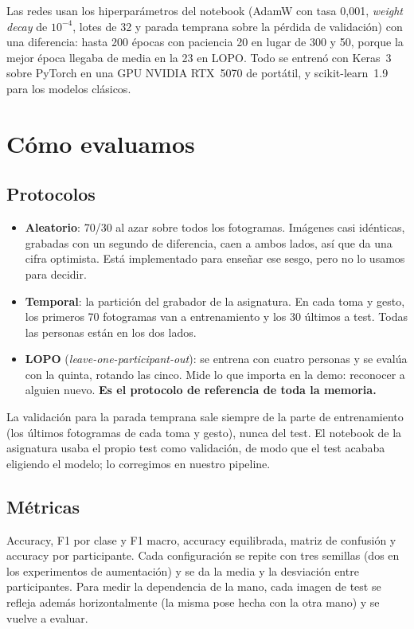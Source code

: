 \documentclass[11pt,a4paper]{article}
\begin{document}
Las redes usan los hiperparámetros del notebook (AdamW con tasa 0,001, \emph{weight decay} de $10^{-4}$, lotes de 32
y parada temprana sobre la pérdida de validación) con una diferencia: hasta 200 épocas con paciencia 20 en lugar de 300
y 50, porque la mejor época llegaba de media en la 23 en LOPO. Todo se entrenó con Keras~3 sobre PyTorch en una GPU
NVIDIA RTX~5070 de portátil, y scikit-learn~1.9 para los modelos clásicos.

\section{Cómo evaluamos}

\subsection{Protocolos}

\begin{itemize}
  \item \textbf{Aleatorio}: 70/30 al azar sobre todos los fotogramas. Imágenes casi idénticas, grabadas con un segundo
        de diferencia, caen a ambos lados, así que da una cifra optimista. Está implementado para enseñar ese sesgo,
        pero no lo usamos para decidir.
  \item \textbf{Temporal}: la partición del grabador de la asignatura. En cada toma y gesto, los primeros 70 fotogramas
        van a entrenamiento y los 30 últimos a test. Todas las personas están en los dos lados.
  \item \textbf{LOPO} (\emph{leave-one-participant-out}): se entrena con cuatro personas y se evalúa con la quinta,
        rotando las cinco. Mide lo que importa en la demo: reconocer a alguien nuevo. \textbf{Es el protocolo de
        referencia de toda la memoria.}
\end{itemize}

La validación para la parada temprana sale siempre de la parte de entrenamiento (los últimos fotogramas de cada toma y
gesto), nunca del test. El notebook de la asignatura usaba el propio test como validación, de modo que el test
acababa eligiendo el modelo; lo corregimos en nuestro pipeline.

\subsection{Métricas}

Accuracy, F1 por clase y F1 macro, accuracy equilibrada, matriz de confusión y accuracy por participante. Cada
configuración se repite con tres semillas (dos en los experimentos de aumentación) y se da la media y la desviación
entre participantes. Para medir la dependencia de la mano, cada imagen de test se refleja además horizontalmente (la
misma pose hecha con la otra mano) y se vuelve a evaluar.
\end{document}
